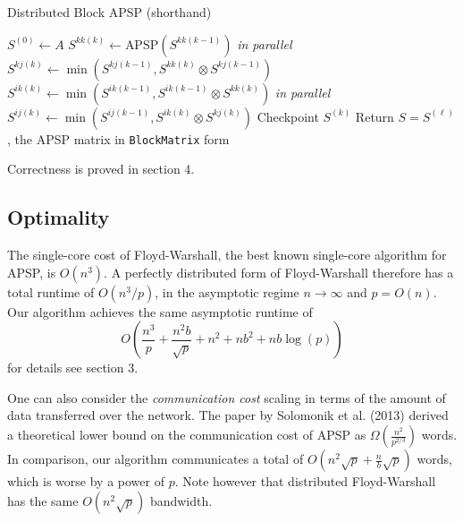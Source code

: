 \documentclass{article} %
\begin{document}
\begin{algorithm}[H]
\caption{Distributed Block APSP (shorthand)}
\begin{algorithmic}
  \State $S^{(0)} \leftarrow A$
    \State [A-step]
    \State $S^{kk(k)} \leftarrow \text{APSP}(S^{kk(k-1)})$
    \State [B-step]
     \emph{in parallel}
        \State $S^{kj(k)} \leftarrow \min(S^{kj(k-1)}, S^{kk(k)} \otimes S^{kj(k-1)})$ 
      \EndIf
        \State $S^{ik(k)} \leftarrow \min(S^{ik(k-1)}, S^{ik(k-1)} \otimes S^{kk(k)})$
      \EndIf
    \EndFor
    \State [C-step]
     \emph{in parallel}
        \State $S^{ij(k)} \leftarrow \min(S^{ij(k-1)}, S^{ik(k)} \otimes S^{kj(k)})$
      \EndIf
    \EndFor
    \State [D-step]
      \State Checkpoint $S^{(k)}$
    \EndIf
  \EndFor
  \State Return $S = S^{(\ell)}$, the APSP matrix in {\tt BlockMatrix} form
\EndFunction
\end{algorithmic}
\end{algorithm}

Correctness is proved in section 4.

\subsection{Optimality}

The single-core cost of Floyd-Warshall, the best known single-core
algorithm for APSP, is $O(n^3)$.  A perfectly distributed form of
Floyd-Warshall therefore has a total runtime of $O(n^3/p)$, in the
asymptotic regime $n \to \infty$ and $p = O(n)$.  Our algorithm
achieves the same asymptotic runtime of
\[
O\left(\frac{n^3}{p} + \frac{n^2b}{\sqrt{p}} + n^2 + nb^2 + nb\log(p)\right)
\]
for details see section 3.

One can also consider the \emph{communication cost} scaling in terms
of the amount of data transferred over the network.  The paper by
Solomonik et al. (2013) derived a theoretical lower bound on the
communication cost of APSP as $\Omega(\frac{n^2}{p^{2/3}})$ words.  In
comparison, our algorithm communicates a total of $O(n^2\sqrt{p} +
\frac{n}{b}\sqrt{p})$ words, which is worse by a power of $p$.  Note
however that distributed Floyd-Warshall has the same $O(n^2\sqrt{p})$
bandwidth.
\end{document}
